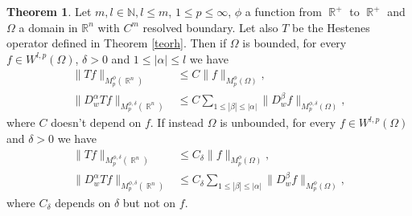 \documentclass[12pt]{article}
\theoremstyle{definition}
\newtheorem{theorem}{Theorem}
\DeclareMathOperator\rr{\mathbb{R}}
\begin{document}
		




\begin{theorem}
Let $m,l \in \mathbb{N}, l\le m$, $1\le p\le\infty$, $\phi$ a function from $\rr^+$ to $\rr^+$ and $\Omega$ a domain in $\mathbb{R}^n$ with $C^m$ resolved boundary. Let also $ T$ be the Hestenes operator defined in Theorem \ref{teorh}. Then if $\Omega$ is bounded, for every $f \in W^{l,p}(\Omega)$, $\delta>0$ and $1\le |\alpha| \le l$ we have
\begin{align}
\| Tf\|_{M_p^\phi(\rr^n)} &\le    C\| f\|_{M_p^\phi(\Omega)}, \label{b0}\\
\| D^\alpha_w Tf\|_{M_p^{\phi,\delta}(\rr^n)} &\le   C\sum_{1\le |\beta|\le|\alpha| }\| D^\beta_wf\|_{M_p^{\phi,\delta}(\Omega)}, \label{bl}
\end{align}
where  $C$ doesn't depend on $f$. If instead $\Omega$ is unbounded, for every $f \in W^{l,p}(\Omega)$ and $\delta>0$ we have
\begin{align}
\| Tf\|_{M_p^{\phi,\delta}(\rr^n)} &\le    C_\delta\| f\|_{M_p^\phi(\Omega)}, \label{u0} \\
\| D^\alpha_w Tf\|_{M_p^{\phi,\delta}(\rr^n)} &\le   C_\delta\sum_{1\le |\beta|\le|\alpha| }\| D^\beta_wf\|_{M_p^\phi(\Omega)}, \label{ul}
\end{align}
where $C_\delta$ depends on $\delta$ but not on $f.$
\end{theorem}
\end{document}
